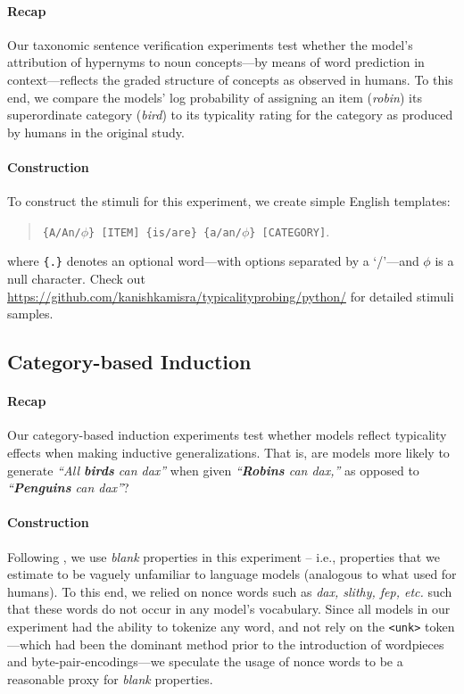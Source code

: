 \documentclass[a4paper, 11pt]{article}
\begin{document}
\paragraph{Recap} Our taxonomic sentence verification experiments test whether the model's attribution of hypernyms to noun concepts---by means of word prediction in context---reflects the graded structure of concepts as observed in humans.
To this end, we compare the models' log probability of assigning an item (\textit{robin}) its superordinate category (\textit{bird}) to its typicality rating for the category as produced by humans in the original study.

\paragraph{Construction} To construct the stimuli for this experiment, we create simple English templates:
\begin{quotation}
    \centering
    \texttt{\{A/An/$\phi$\} [ITEM] \{is/are\} \{a/an/$\phi$\} [CATEGORY]}.
\end{quotation}
where \texttt{\{.\}} denotes an optional word---with options separated by a `/'---and $\phi$ is a null character.
Check out \url{https://github.com/kanishkamisra/typicalityprobing/python/} for detailed stimuli samples.

\subsection{Category-based Induction}
\paragraph{Recap} Our category-based induction experiments test whether models reflect typicality effects when making inductive generalizations. That is, are models more likely to generate \textit{``All \textbf{\textcolor{blu}{birds}} can dax''} when given \textit{``\textbf{\textcolor{blu}{Robins}} can dax,''} as opposed to \textit{``\textbf{\textcolor{blu}{Penguins}} can dax''}?

\paragraph{Construction} Following \citet{osherson1990category}, we use \textit{blank} properties in this experiment -- i.e., properties that we estimate to be vaguely unfamiliar to language models (analogous to what \citeauthor{osherson1990category} used for humans).
To this end, we relied on nonce words such as \textit{dax, slithy, fep, etc.} such that these words do not occur in any model's vocabulary.
Since all models in our experiment had the ability to tokenize any word, and not rely on the \texttt{\textless{}unk\textgreater} token---which had been the dominant method prior to the introduction of wordpieces and byte-pair-encodings---we speculate the usage of nonce words to be a reasonable proxy for \textit{blank} properties.
\end{document}
